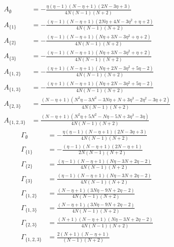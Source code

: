 \documentclass[11pt]{article}
\begin{document}
\begin{align*}
  A_{\emptyset} &= - \frac{\eta \left(\eta - 1\right) \left(N - \eta + 1\right) \left(2 N - 3 \eta + 3\right)}{4 N \left(N - 1\right) \left(N + 2\right)} \\
  A_{\{1\}} &= - \frac{\left(\eta - 1\right) \left(N - \eta + 1\right) \left(2 N \eta + 4 N - 3 \eta^{2} + \eta + 2\right)}{4 N \left(N - 1\right) \left(N + 2\right)} \\
  A_{\{2\}} &= - \frac{\left(\eta - 1\right) \left(N - \eta + 1\right) \left(N \eta + 3 N - 3 \eta^{2} + \eta + 2\right)}{4 N \left(N - 1\right) \left(N + 2\right)} \\
  A_{\{3\}} &= - \frac{\left(\eta - 1\right) \left(N - \eta + 1\right) \left(N \eta + 3 N - 3 \eta^{2} + \eta + 2\right)}{4 N \left(N - 1\right) \left(N + 2\right)} \\
  A_{\{1,2\}} &= - \frac{\left(\eta + 1\right) \left(N - \eta + 1\right) \left(N \eta + 2 N - 3 \eta^{2} + 5 \eta - 2\right)}{4 N \left(N - 1\right) \left(N + 2\right)} \\
  A_{\{1,3\}} &= - \frac{\left(\eta + 1\right) \left(N - \eta + 1\right) \left(N \eta + 2 N - 3 \eta^{2} + 5 \eta - 2\right)}{4 N \left(N - 1\right) \left(N + 2\right)} \\
  A_{\{2,3\}} &= \frac{\left(N - \eta + 1\right) \left(N^{2} \eta - 3 N^{2} - 3 N \eta + N + 3 \eta^{3} - 2 \eta^{2} - 3 \eta + 2\right)}{4 N \left(N - 1\right) \left(N + 2\right)} \\
  A_{\{1,2,3\}} &= \frac{\left(N - \eta + 1\right) \left(N^{2} \eta + 5 N^{2} - N \eta - 5 N + 3 \eta^{3} - 3 \eta\right)}{4 N \left(N - 1\right) \left(N + 2\right)} 
\end{align*}
\begin{align*}
  \Gamma_{\emptyset} &= - \frac{\eta \left(\eta - 1\right) \left(N - \eta + 1\right) \left(2 N - 3 \eta + 3\right)}{4 N \left(N - 1\right) \left(N + 2\right)} \\
  \Gamma_{\{1\}} &= - \frac{\left(\eta - 1\right) \left(N - \eta + 1\right) \left(2 N - \eta + 1\right)}{2 N \left(N - 1\right) \left(N + 2\right)} \\
  \Gamma_{\{2\}} &= \frac{\left(\eta - 1\right) \left(N - \eta + 1\right) \left(N \eta - 3 N + 2 \eta - 2\right)}{4 N \left(N - 1\right) \left(N + 2\right)} \\
  \Gamma_{\{3\}} &= \frac{\left(\eta - 1\right) \left(N - \eta + 1\right) \left(N \eta - 3 N + 2 \eta - 2\right)}{4 N \left(N - 1\right) \left(N + 2\right)} \\
  \Gamma_{\{1,2\}} &= \frac{\left(N - \eta + 1\right) \left(3 N \eta - 9 N + 2 \eta - 2\right)}{4 N \left(N - 1\right) \left(N + 2\right)} \\
  \Gamma_{\{1,3\}} &= \frac{\left(N - \eta + 1\right) \left(3 N \eta - 9 N + 2 \eta - 2\right)}{4 N \left(N - 1\right) \left(N + 2\right)} \\
  \Gamma_{\{2,3\}} &= \frac{\left(N + 1\right) \left(N - \eta + 1\right) \left(N \eta - 3 N + 2 \eta - 2\right)}{4 N \left(N - 1\right) \left(N + 2\right)} \\
  \Gamma_{\{1,2,3\}} &= \frac{2 \left(N + 1\right) \left(N - \eta + 1\right)}{\left(N - 1\right) \left(N + 2\right)} 
\end{align*}
\end{document}

